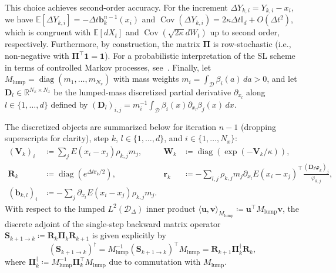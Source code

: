 \documentclass[10pt,a4paper]{article}
\begin{document}
This choice achieves second-order accuracy. For the increment $\Delta Y_{k,i} = Y_{k,i} - x_i$, we have $\mathbb{E}[\Delta Y_{k,i}] = -\Delta t \mathbf{b}_k^{n-1}(x_i)$ and $\operatorname{Cov}(\Delta Y_{k,i}) = 2\kappa \Delta t \mathbb{I}_d + O(\Delta t^2)$, which is congruent with $\mathbb{E}[dX_t]$ and $\operatorname{Cov}(\sqrt{2\kappa} dW_t)$ up to second order, respectively. Furthermore, by construction, the matrix $\mathbf{\Pi}$ is row-stochastic (i.e., non-negative with $\mathbf{\Pi}^\top \mathbf{1} = \mathbf{1}$). For a probabilistic interpretation of the SL scheme in terms of controlled Markov processes, see~\cite{CalzolaCarliniDupuisSilva2023}. Finally, let $M_{\text{lump}} = \operatorname{diag}(m_1, \dots, m_{N_x})$ with mass weights $m_i = \int_{\mathcal{D}} \beta_i(a)\,da > 0$, and let $\mathbf{D}_l \in \mathbb{R}^{N_x \times N_x}$ be the lumped-mass discretized partial derivative $\partial_{x_l}$ along $l \in \{1, \dots, d\}$ defined by $(\mathbf{D}_l)_{i,j} = m_i^{-1} \int_{\mathcal{D}} \beta_i(x)\partial_{x_l}\beta_j(x)\,dx$.%

The discretized objects are summarized below for iteration $n-1$ (dropping superscripts for clarity), step $k$, $l \in \{1, \dots, d\}$, and $i \in \{1, \dots, N_x\}$:
\begin{equation}
\begin{aligned}
(\mathbf{V}_k)_i &\coloneq \sum_j E(x_i - x_j)\rho_{k,j} m_j, & \mathbf{W}_k &\coloneq \operatorname{diag}\left(\exp(-\mathbf{V}_k/\kappa)\right), \\
\mathbf{R}_k &\coloneq \operatorname{diag}\left(e^{\Delta t \mathbf{r}_k/2}\right), & \mathbf{r}_k &\coloneq -\sum_{l,j} \rho_{k,j} m_j \partial_{x_l} E(x_i - x_j)^\top \frac{(\mathbf{D}_l \boldsymbol{\varphi}_k)_j}{\varphi_{k,j}}, \\
(\mathbf{b}_{k,l})_i &\coloneq -\sum_j \partial_{x_l} E(x_i - x_j)\rho_{k,j} m_j. & &
\end{aligned}
\end{equation}%
With respect to the lumped $L^2(\mathcal{D}_\Delta)$ inner product $\langle \mathbf{u}, \mathbf{v} \rangle_{M_{\text{lump}}} \coloneq \mathbf{u}^\top M_{\text{lump}}\mathbf{v}$, the discrete adjoint of the single-step backward matrix operator $\mathbf{S}_{k+1\to k} \coloneq \mathbf{R}_k \mathbf{\Pi}_k \mathbf{R}_{k+1}$ is given explicitly by
\begin{equation}
(\mathbf{S}_{k+1\to k})^\dagger = M_{\text{lump}}^{-1} (\mathbf{S}_{k+1\to k})^\top M_{\text{lump}} = \mathbf{R}_{k+1} \mathbf{\Pi}_k^\dagger \mathbf{R}_k,
\end{equation}%
where $\mathbf{\Pi}_k^\dagger \coloneq M_{\text{lump}}^{-1} \mathbf{\Pi}_k^\top M_{\text{lump}}$ due to commutation with $M_{\text{lump}}$.
\end{document}
